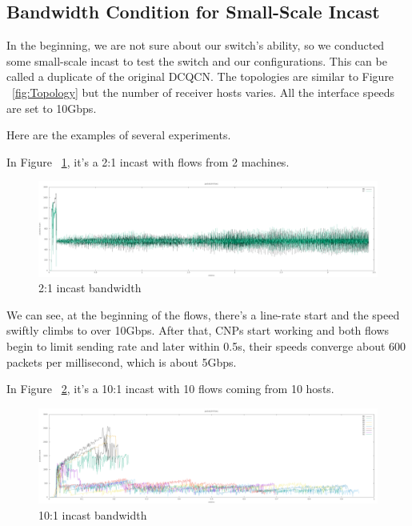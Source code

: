 \documentclass[12pt,a4paper]{article}
\begin{document}
\subsection{Bandwidth Condition for Small-Scale Incast}
In the beginning, we are not sure about our switch's ability, so we conducted some small-scale incast to test the switch and our configurations.
This can be called a duplicate of the original DCQCN.
The topologies are similar to Figure ~\ref{fig:Topology} but the number of receiver hosts varies.
All the interface speeds are set to 10Gbps.

Here are the examples of several experiments.

In Figure ~\ref{fig:2on1_1}, it's a 2:1 incast with flows from 2 machines.

\begin{figure}[h!]
	\begin{center}
		\includegraphics[width=6in]{2on1_1}
		\caption{2:1 incast bandwidth}
		\label{fig:2on1_1}
	\end{center}
\end{figure}

We can see, at the beginning of the flows, there's a line-rate start and the speed swiftly climbs to over 10Gbps.
After that, CNPs start working and both flows begin to limit sending rate and later within 0.5s, their speeds converge about
600 packets per millisecond, which is about 5Gbps.

In Figure ~\ref{fig:10on1_1}, it's a 10:1 incast with 10 flows coming from 10 hosts.

\begin{figure}[h!]
	\begin{center}
		\includegraphics[width=6in]{10on1_1}
		\caption{10:1 incast bandwidth}
		\label{fig:10on1_1}
	\end{center}
\end{figure}
\end{document}
